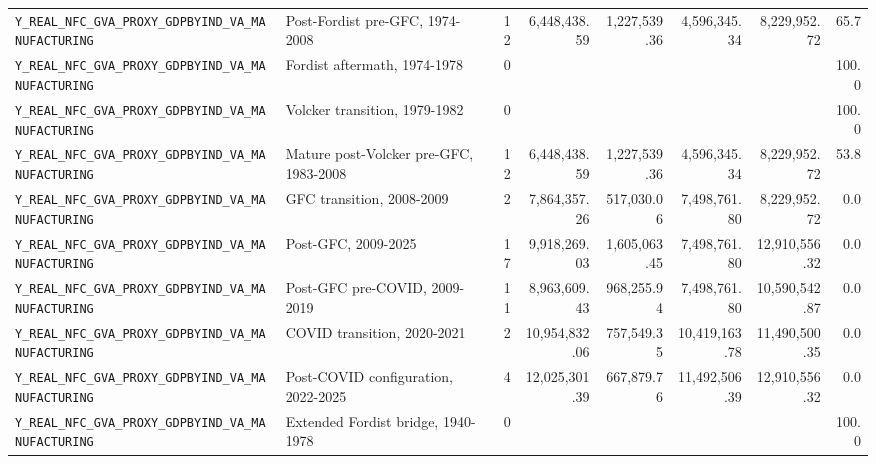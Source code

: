 \begin{landscape}
\begin{longtable}{p{4.4cm}p{3.8cm}rrrrrr}
\\
\nolinkurl{Y_REAL_NFC_GVA_PROXY_GDPBYIND_VA_MANUFACTURING} & Post-Fordist pre-GFC, 1974-2008 & 12 & 6,448,438.59 & 1,227,539.36 & 4,596,345.34 & 8,229,952.72 & 65.7
\\
\nolinkurl{Y_REAL_NFC_GVA_PROXY_GDPBYIND_VA_MANUFACTURING} & Fordist aftermath, 1974-1978 & 0 &  &  &  &  & 100.0
\\
\nolinkurl{Y_REAL_NFC_GVA_PROXY_GDPBYIND_VA_MANUFACTURING} & Volcker transition, 1979-1982 & 0 &  &  &  &  & 100.0
\\
\nolinkurl{Y_REAL_NFC_GVA_PROXY_GDPBYIND_VA_MANUFACTURING} & Mature post-Volcker pre-GFC, 1983-2008 & 12 & 6,448,438.59 & 1,227,539.36 & 4,596,345.34 & 8,229,952.72 & 53.8
\\
\nolinkurl{Y_REAL_NFC_GVA_PROXY_GDPBYIND_VA_MANUFACTURING} & GFC transition, 2008-2009 & 2 & 7,864,357.26 & 517,030.06 & 7,498,761.80 & 8,229,952.72 & 0.0
\\
\nolinkurl{Y_REAL_NFC_GVA_PROXY_GDPBYIND_VA_MANUFACTURING} & Post-GFC, 2009-2025 & 17 & 9,918,269.03 & 1,605,063.45 & 7,498,761.80 & 12,910,556.32 & 0.0
\\
\nolinkurl{Y_REAL_NFC_GVA_PROXY_GDPBYIND_VA_MANUFACTURING} & Post-GFC pre-COVID, 2009-2019 & 11 & 8,963,609.43 & 968,255.94 & 7,498,761.80 & 10,590,542.87 & 0.0
\\
\nolinkurl{Y_REAL_NFC_GVA_PROXY_GDPBYIND_VA_MANUFACTURING} & COVID transition, 2020-2021 & 2 & 10,954,832.06 & 757,549.35 & 10,419,163.78 & 11,490,500.35 & 0.0
\\
\nolinkurl{Y_REAL_NFC_GVA_PROXY_GDPBYIND_VA_MANUFACTURING} & Post-COVID configuration, 2022-2025 & 4 & 12,025,301.39 & 667,879.76 & 11,492,506.39 & 12,910,556.32 & 0.0
\\
\nolinkurl{Y_REAL_NFC_GVA_PROXY_GDPBYIND_VA_MANUFACTURING} & Extended Fordist bridge, 1940-1978 & 0 &  &  &  &  & 100.0
\\
\bottomrule
\end{longtable}
\end{landscape}
